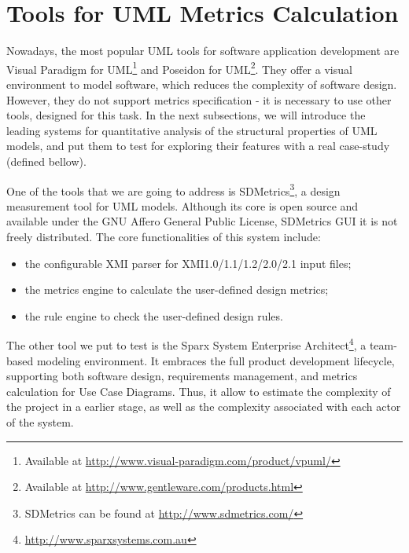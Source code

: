 \section{Tools for UML Metrics Calculation} \label{tools}

Nowadays, the most popular UML tools for software application development are \textsf{Visual Paradigm for UML\footnote{Available at \url{http://www.visual-paradigm.com/product/vpuml/}}} and \textsf{Poseidon for UML}\footnote{Available at \url{http://www.gentleware.com/products.html}}.
They offer a visual environment to model software, which reduces the complexity of software design.
However, they do not support metrics specification - it is necessary to use other tools, designed for this task.
In the next subsections, we will introduce the leading systems for quantitative analysis of the structural properties of UML models, and put them to test for exploring their features with a real case-study (defined bellow).

One of the tools that we are going to address is SDMetrics\footnote{SDMetrics can be found at \url{http://www.sdmetrics.com/}}, a design measurement tool for UML models.
Although its core is open source and available under the GNU Affero General Public License, SDMetrics GUI it is not freely distributed. 
The core functionalities of this system include:
\begin{itemize}
\item the configurable XMI parser for XMI1.0/1.1/1.2/2.0/2.1 input files;
\item the metrics engine to calculate the user-defined design metrics;
\item the rule engine to check the user-defined design rules.
\end{itemize}


The other tool we put to test is the \textsf{Sparx System Enterprise Architect}{\footnote{\url{http://www.sparxsystems.com.au}}}, a team-based modeling environment. 
It embraces the full product development lifecycle, supporting both software design, requirements management, and metrics calculation for Use Case Diagrams.
Thus, it allow to estimate the complexity of the project in a earlier stage, as well as the complexity associated with each actor of the system.
